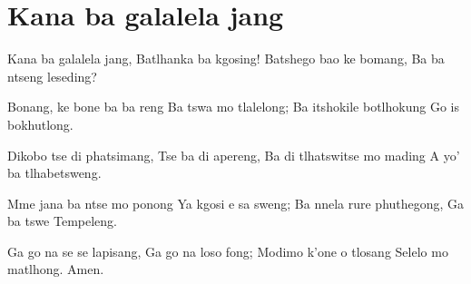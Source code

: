 \starttocol
\chapter{Kana ba galalela jang}
\nexttocol
\hfill{\it }
\stoptocol
\starttocol
\startlines
{\sc Kana} ba galalela jang,
Batlhanka ba kgosing!
Batshego bao ke bomang,
Ba ba ntseng leseding?
 
Bonang, ke bone ba ba reng
Ba tswa mo tlalelong;
Ba itshokile botlhokung
Go is bokhutlong.

Dikobo tse di phatsimang,
Tse ba di apereng,
Ba di tlhatswitse mo mading
A yo' ba tlhabetsweng.

Mme jana ba ntse mo ponong
Ya kgosi e sa sweng;
Ba nnela rure phuthegong,
Ga ba tswe Tempeleng.

Ga go na se se lapisang,
Ga go na loso fong;
Modimo k'one o tlosang 
Selelo mo matlhong. 
       \hfill Amen.~~~~~~~~~

\stoplines
\nexttocol

\stoptocol
